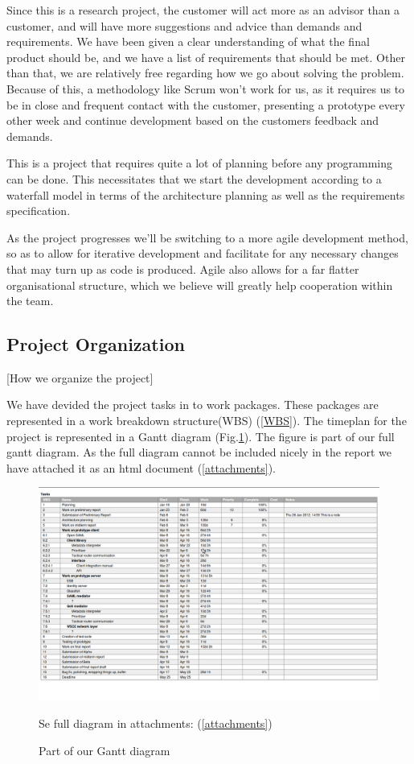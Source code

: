\documentclass[12pt]{article}
\begin{document}
    Since this is a research project, the customer will act more as an advisor than a customer, and will have more suggestions and advice than demands and requirements. We have been given a clear understanding of what the final product should be, and we have a list of requirements that should be met. Other than that, we are relatively free regarding how we go about solving the problem. Because of this, a methodology like Scrum won't work for us, as it requires us to be in close and frequent contact with the customer, presenting a prototype every other week and continue development based on the customers feedback and demands.
    
    This is a project that requires quite a lot of planning before any programming can be done. This necessitates that we start the development according to a waterfall model in terms of the architecture planning as well as the requirements specification.
    
    As the project progresses we’ll be switching to a more agile development method, so as to allow for iterative development and facilitate for any necessary changes that may turn up as code is produced. Agile also allows for a far flatter organisational structure, which we believe will greatly help cooperation within the team.

    \subsection{Project Organization}\label{projectorg}[How we organize the project]
    
    We have devided the project tasks in to work packages. These packages are represented in a work breakdown structure(WBS) (\ref{WBS}). The timeplan for the project is represented in a Gantt diagram (Fig.\ref{fig:gantt}). The figure is part of our full gantt diagram. As the full diagram cannot be included nicely in the report we have attached it as an html document (\ref{attachments}).
     
        \begin{figure}[h]
            \centering
            \includegraphics[scale=0.3]{gantt}
            \caption{Part of our Gantt diagram} Se full diagram in attachments: (\ref{attachments})
            \label{fig:gantt}
        \end{figure}
    
\end{document}
